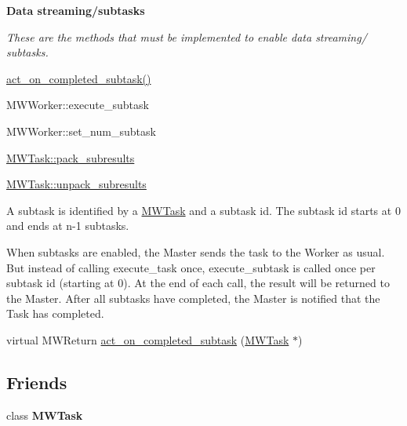 \begin{Indent}\textbf{ Data streaming/subtasks}\par
{\em These are the methods that must be implemented to enable data streaming/ subtasks.
\begin{DoxyItemize}
\item \hyperlink{classMWDriver_aeb92065d166911049bec838253554555}{act\+\_\+on\+\_\+completed\+\_\+subtask()}
\item M\+W\+Worker\+::execute\+\_\+subtask
\item M\+W\+Worker\+::set\+\_\+num\+\_\+subtask
\item \hyperlink{classMWTask_a1a1b24e608337f787966b5d91f04f7de}{M\+W\+Task\+::pack\+\_\+subresults}
\item \hyperlink{classMWTask_ae6fe9fd144486e79c19a1087da1fd7ab}{M\+W\+Task\+::unpack\+\_\+subresults}
\end{DoxyItemize}

A subtask is identified by a \hyperlink{classMWTask}{M\+W\+Task} and a subtask id. The subtask id starts at 0 and ends at n-\/1 subtasks.

When subtasks are enabled, the Master sends the task to the Worker as usual. But instead of calling execute\+\_\+task once, execute\+\_\+subtask is called once per subtask id (starting at 0). At the end of each call, the result will be returned to the Master. After all subtasks have completed, the Master is notified that the Task has completed. }\begin{DoxyCompactItemize}
\item 
virtual M\+W\+Return \hyperlink{classMWDriver_aeb92065d166911049bec838253554555}{act\+\_\+on\+\_\+completed\+\_\+subtask} (\hyperlink{classMWTask}{M\+W\+Task} $\ast$)
\end{DoxyCompactItemize}
\end{Indent}
\subsection*{Friends}
\begin{DoxyCompactItemize}
\item 
\mbox{\label{classMWDriver_a7f5e4f492b6cae4d6ac5f83e48b79300}} 
class {\bfseries M\+W\+Task}
\end{DoxyCompactItemize}
